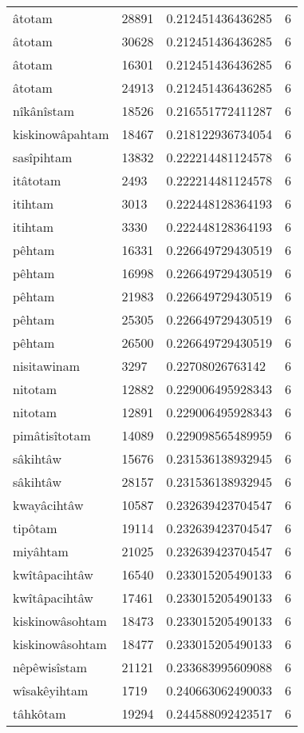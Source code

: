 \begin{longtable}{llll}
âtotam & 28891 & 0.212451436436285 & 6 \\
âtotam & 30628 & 0.212451436436285 & 6 \\
âtotam & 16301 & 0.212451436436285 & 6 \\
âtotam & 24913 & 0.212451436436285 & 6 \\
nîkânîstam & 18526 & 0.216551772411287 & 6 \\
kiskinowâpahtam & 18467 & 0.218122936734054 & 6 \\
sasîpihtam & 13832 & 0.222214481124578 & 6 \\
itâtotam & 2493 & 0.222214481124578 & 6 \\
itihtam & 3013 & 0.222448128364193 & 6 \\
itihtam & 3330 & 0.222448128364193 & 6 \\
pêhtam & 16331 & 0.226649729430519 & 6 \\
pêhtam & 16998 & 0.226649729430519 & 6 \\
pêhtam & 21983 & 0.226649729430519 & 6 \\
pêhtam & 25305 & 0.226649729430519 & 6 \\
pêhtam & 26500 & 0.226649729430519 & 6 \\
nisitawinam & 3297 & 0.22708026763142 & 6 \\
nitotam & 12882 & 0.229006495928343 & 6 \\
nitotam & 12891 & 0.229006495928343 & 6 \\
pimâtisîtotam & 14089 & 0.229098565489959 & 6 \\
sâkihtâw & 15676 & 0.231536138932945 & 6 \\
sâkihtâw & 28157 & 0.231536138932945 & 6 \\
kwayâcihtâw & 10587 & 0.232639423704547 & 6 \\
tipôtam & 19114 & 0.232639423704547 & 6 \\
miyâhtam & 21025 & 0.232639423704547 & 6 \\
kwîtâpacihtâw & 16540 & 0.233015205490133 & 6 \\
kwîtâpacihtâw & 17461 & 0.233015205490133 & 6 \\
kiskinowâsohtam & 18473 & 0.233015205490133 & 6 \\
kiskinowâsohtam & 18477 & 0.233015205490133 & 6 \\
nêpêwisîstam & 21121 & 0.233683995609088 & 6 \\
wîsakêyihtam & 1719 & 0.240663062490033 & 6 \\
tâhkôtam & 19294 & 0.244588092423517 & 6 \\

\end{longtable}
